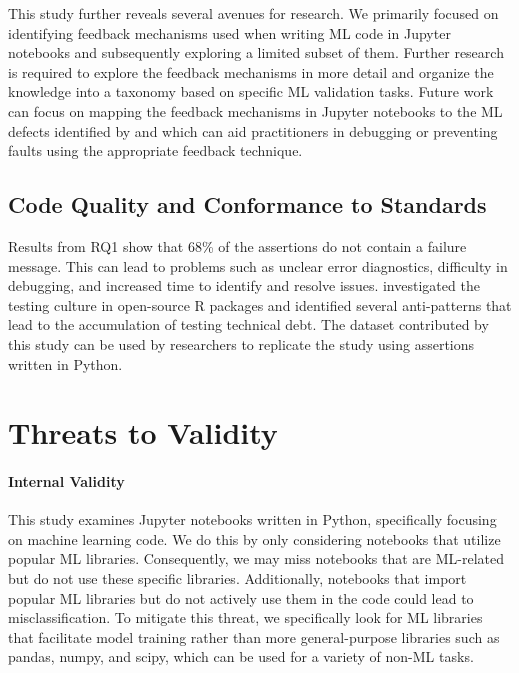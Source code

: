\documentclass[smallextended]{svjour3}       %
\begin{document}
This study further reveals several avenues for research. We primarily focused on identifying feedback mechanisms used when writing ML code in Jupyter notebooks and subsequently exploring a limited subset of them. Further research is required to explore the feedback mechanisms in more detail and organize the knowledge into a taxonomy based on specific ML validation tasks. Future work can focus on mapping the feedback mechanisms in Jupyter notebooks to the ML defects identified by \citet{humbatova2020taxonomy} and \citet{morovati2023bugs} which can aid practitioners in debugging or preventing faults using the appropriate feedback technique.

\subsection{Code Quality and Conformance to Standards}

Results from RQ1 show that 68\% of the assertions do not contain a failure message. This can lead to problems such as unclear error diagnostics, difficulty in debugging, and increased time to identify and resolve issues. \citet{vidoni2021evaluating} investigated the testing culture in open-source R packages and identified several anti-patterns that lead to the accumulation of testing technical debt. The dataset contributed by this study can be used by researchers to replicate the \citet{vidoni2021evaluating} study using assertions written in Python.

\section{Threats to Validity}\label{sec:threats}

\paragraph{\textbf{Internal Validity}} This study examines Jupyter notebooks written in Python, specifically focusing on machine learning code. We do this by only considering notebooks that utilize popular ML libraries. Consequently, we may miss notebooks that are ML-related but do not use these specific libraries. Additionally, notebooks that import popular ML libraries but do not actively use them in the code could lead to misclassification. To mitigate this threat, we specifically look for ML libraries that facilitate model training rather than more general-purpose libraries such as pandas, numpy, and scipy, which can be used for a variety of non-ML tasks.
\end{document}
